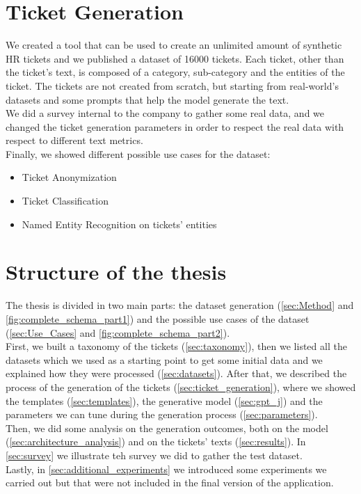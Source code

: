 \section{Ticket Generation}
We created a tool that can be used to create an unlimited amount of synthetic HR tickets and we published a dataset of 16000 tickets. Each ticket, other than the ticket's text, is composed of a category, sub-category and the entities of the ticket. The tickets are not created from scratch, but starting from real-world's datasets and some prompts that help the model generate the text. \\
We did a survey internal to the company to gather some real data, and we changed the ticket generation parameters in order to respect the real data with respect to different text metrics. \\
Finally, we showed different possible use cases for the dataset:
\begin{itemize}
    \item Ticket Anonymization
    \item Ticket Classification
    \item Named Entity Recognition on tickets' entities
\end{itemize}

\section{Structure of the thesis}
The thesis is divided in two main parts: the dataset generation (\autoref{sec:Method} and \autoref{fig:complete_schema_part1}) and the possible use cases of the dataset (\autoref{sec:Use_Cases} and \autoref{fig:complete_schema_part2}).\\

First, we built a taxonomy of the tickets (\autoref{sec:taxonomy}), then we listed all the datasets which we used as a starting point to get some initial data and we explained how they were processed (\autoref{sec:datasets}). After that, we described the process of the generation of the tickets (\autoref{sec:ticket_generation}), where we showed the templates (\autoref{sec:templates}), the generative model (\autoref{sec:gpt_j}) and the parameters we can tune during the generation process (\autoref{sec:parameters}). \\
Then, we did some analysis on the generation outcomes, both on the model (\autoref{sec:architecture_analysis}) and on the tickets' texts (\autoref{sec:results}). In \autoref{sec:survey} we illustrate teh survey we did to gather the test dataset. \\
Lastly, in \autoref{sec:additional_experiments} we introduced some experiments we carried out but that were not included in the final version of the application.\\

